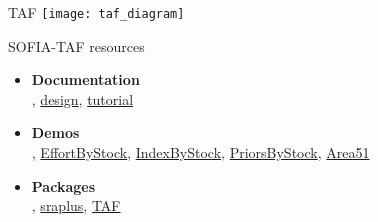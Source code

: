 \documentclass[aspectratio=169]{beamer}
\begin{document}

\begin{frame}{TAF}
  \centering
  \texttt{[image: taf\_diagram]}
\end{frame}


\begin{frame}[plain]
\end{frame}


\begin{frame}[plain]
\end{frame}


\begin{frame}{SOFIA-TAF resources}
  \begin{itemize}
    \item[] {\bf\darkgray Documentation}\\[0.5ex]
    ,
    {\blue\href{https://arni-magnusson.github.io/pdf/2021-sofia-taf.pdf}{design}},
    {\blue\href{https://github.com/sofia-taf/doc/blob/main/sofia_taf_tutorial.md}{tutorial}}\\[5ex]
    \item[] {\bf\darkgray Demos}\\[0.5ex]
    ,
    {\blue\href{https://github.com/sofia-taf/2022Area31EffortByStock}{EffortByStock}},
    {\blue\href{https://github.com/sofia-taf/2022Area31IndexByStock}{IndexByStock}},
    {\blue\href{https://github.com/sofia-taf/2022Area41PriorsByStock}{PriorsByStock}},
    {\blue\href{https://github.com/sofia-taf/2023Area51ShortDemo}{Area51}}\\[5ex]
    \item[] {\bf\darkgray Packages}\\[0.5ex]
    ,
    {\blue\href{https://github.com/DanOvando/sraplus}{sraplus}},
    {\blue\href{https://github.com/ices-tools-prod/TAF}{TAF}}
  \end{itemize}
\end{frame}
\end{document}
